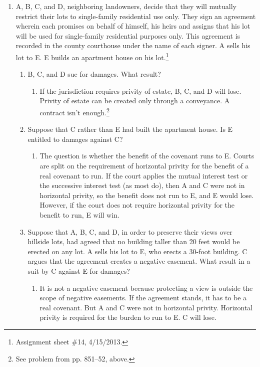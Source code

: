 \begin{enumerate}
    \item A, B, C, and D, neighboring landowners, decide that they will 
    mutually restrict their lots to single-family residential use only. They 
    sign an agreement wherein each promises on behalf of himself, his heirs 
    and assigns that his lot will be used for single-family residential 
    purposes only. This agreement is recorded in the county courthouse under 
    the name of each signer. A sells his lot to E. E builds an apartment house 
    on his lot.\footnote{Assignment sheet \#14, 4/15/2013.}
    \begin{enumerate}
        \item B, C, and D sue for damages. What result?
        \begin{enumerate}
            \item If the jurisdiction requires privity of estate, B, C, and D 
            will lose. Privity of estate can be created only through a 
            conveyance. A contract isn't enough.\footnote{See problem from pp. 
            851--52, above.}
        \end{enumerate}
        \item Suppose that C rather than E had built the apartment house. Is E 
        entitled to damages against C?
        \begin{enumerate}
            \item The question is whether the benefit of the covenant runs to 
            E. Courts are split on the requirement of horizontal privity for 
            the benefit of a real covenant to run. If the court applies the 
            mutual interest test or the successive interest test (as most do), 
            then A and C were not in horizontal privity, so the benefit does 
            not run to E, and E would lose. However, if the court does not 
            require horizontal privity for the benefit to run, E will win.
        \end{enumerate}
        \item Suppose that A, B, C, and D, in order to preserve their views 
        over hillside lots, had agreed that no building taller than 20 feet 
        would be erected on any lot. A sells his lot to E, who erects a 
        30-foot building. C argues that the agreement creates a negative 
        easement. What result in a suit by C against E for damages?    
        \begin{enumerate}
            \item It is not a negative easement because protecting a view is 
            outside the scope of negative easements. If the agreement stands, 
            it has to be a real covenant. But A and C were not in horizontal 
            privity. Horizontal privity is required for the burden to run to 
            E. C will lose.
        \end{enumerate}
    \end{enumerate}
\end{enumerate}

